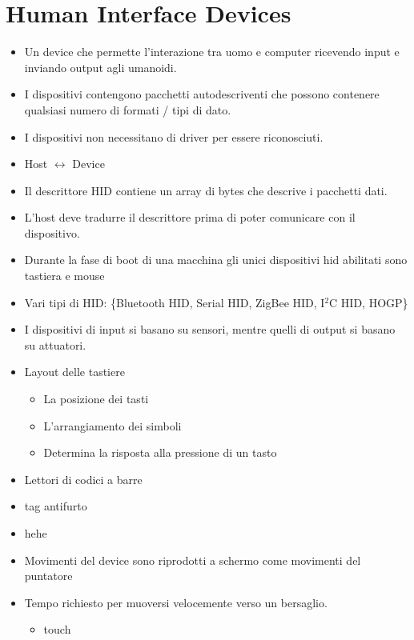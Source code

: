 \chapter{Human Interface Devices}

\begin{itemize}
    \item {} Un device che permette l'interazione tra uomo e computer ricevendo input e inviando output agli umanoidi.
    \item I dispositivi  contengono pacchetti autodescriventi che possono contenere qualsiasi numero di formati / tipi di dato.
    \item I dispositivi  non necessitano di driver per essere riconosciuti.
    \item Host $\leftrightarrow$ Device
    \item Il descrittore HID contiene un array di bytes che descrive i pacchetti dati.
    \item L'host deve tradurre il descrittore prima di poter comunicare con il dispositivo.
    \item Durante la fase di boot di una macchina gli unici dispositivi hid abilitati sono tastiera e mouse
    \item Vari tipi di HID: \{Bluetooth HID, Serial HID, ZigBee HID, I$^2$C HID, HOGP\}
    \item I dispositivi di input si basano su sensori, mentre quelli di output si basano su attuatori.
    \item Layout delle tastiere
    \begin{itemize}
        \item {} La posizione dei tasti
        \item {} L'arrangiamento dei simboli
        \item {} Determina la risposta alla pressione di un tasto
    \end{itemize}
    \item Lettori di codici a barre
    \item {} tag antifurto
    \item {} hehe
    \item {} Movimenti del device sono riprodotti a schermo come movimenti del puntatore
    \item {} Tempo richiesto per muoversi velocemente verso un bersaglio.
    \begin{itemize}
        \item {} touch

\end{itemize}
\end{itemize}
